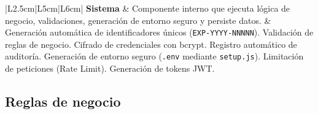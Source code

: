 \documentclass[11pt,a4paper]{article}
\begin{document}
\begin{longtable}{|L{2.5cm}|L{5cm}|L{6cm}|}
    \textbf{Sistema}       & Componente interno que ejecuta lógica de negocio, validaciones, generación de entorno seguro y persiste datos.                               &
    Generación automática de identificadores únicos (\texttt{EXP-YYYY-NNNNN}). Validación de reglas de negocio. Cifrado de credenciales con bcrypt. Registro automático de auditoría. Generación de entorno seguro (\texttt{.env} mediante \texttt{setup.js}). Limitación de peticiones (Rate Limit). Generación de tokens JWT. \\
    \hline
\end{longtable}

\subsection{Reglas de negocio}
\end{document}
